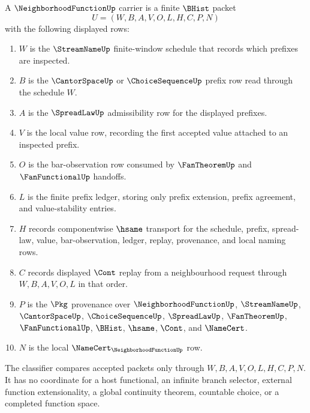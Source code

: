 \begin{definition}
\label{def:neighborhood-function-carrier}
A $\NeighborhoodFunctionUp$ carrier is a finite $\BHist$ packet
$$
U=(W,B,A,V,O,L,H,C,P,N)
$$
with the following displayed rows:
\begin{enumerate}
\item $W$ is the $\StreamNameUp$ finite-window schedule that records which prefixes are inspected.
\item $B$ is the $\CantorSpaceUp$ or $\ChoiceSequenceUp$ prefix row read through the schedule $W$.
\item $A$ is the $\SpreadLawUp$ admissibility row for the displayed prefixes.
\item $V$ is the local value row, recording the first accepted value attached to an inspected prefix.
\item $O$ is the bar-observation row consumed by $\FanTheoremUp$ and $\FanFunctionalUp$ handoffs.
\item $L$ is the finite prefix ledger, storing only prefix extension, prefix agreement, and value-stability entries.
\item $H$ records componentwise $\hsame$ transport for the schedule, prefix, spread-law, value, bar-observation, ledger, replay, provenance, and local naming rows.
\item $C$ records displayed $\Cont$ replay from a neighbourhood request through $W,B,A,V,O,L$ in that order.
\item $P$ is the $\Pkg$ provenance over $\NeighborhoodFunctionUp$, $\StreamNameUp$, $\CantorSpaceUp$, $\ChoiceSequenceUp$, $\SpreadLawUp$, $\FanTheoremUp$, $\FanFunctionalUp$, $\BHist$, $\hsame$, $\Cont$, and $\NameCert$.
\item $N$ is the local $\NameCert_{\NeighborhoodFunctionUp}$ row.
\end{enumerate}
The classifier compares accepted packets only through $W,B,A,V,O,L,H,C,P,N$. It has no coordinate for a host functional, an infinite branch selector, external function extensionality, a global continuity theorem, countable choice, or a completed function space.
\end{definition}

